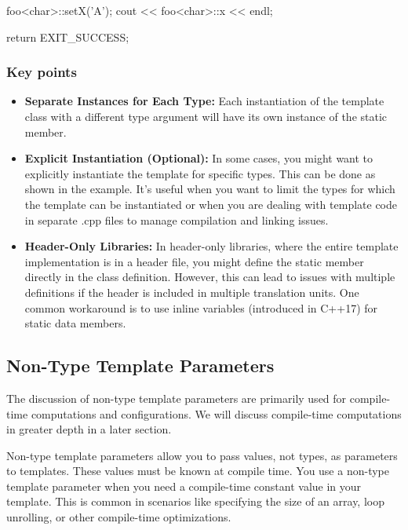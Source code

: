\documentclass{report}
\begin{document}
\begin{concept}
\begin{cppcode}
{        foo<char>::setX('A');
        cout << foo<char>::x << endl;

        return EXIT_SUCCESS;
    }
    \end{cppcode}

    \pagebreak 
    \subsubsection{Key points}
    \begin{itemize}
        \item \textbf{Separate Instances for Each Type:} Each instantiation of the template class with a different type argument will have its own instance of the static member. 
        \item \textbf{Explicit Instantiation (Optional):} In some cases, you might want to explicitly instantiate the template for specific types. This can be done as shown in the example. It's useful when you want to limit the types for which the template can be instantiated or when you are dealing with template code in separate .cpp files to manage compilation and linking issues.
        \item \textbf{Header-Only Libraries:} In header-only libraries, where the entire template implementation is in a header file, you might define the static member directly in the class definition. However, this can lead to issues with multiple definitions if the header is included in multiple translation units. One common workaround is to use inline variables (introduced in C++17) for static data members.
    \end{itemize}

    \bigbreak \noindent 
    \subsection{Non-Type Template Parameters}
    \bigbreak \noindent 
    \begin{remark}
        The discussion of non-type template parameters are primarily used for compile-time computations and configurations. We will discuss compile-time computations in greater depth in a later section.
    \end{remark}

    \bigbreak \noindent 
    \begin{concept}
        Non-type template parameters allow you to pass values, not types, as parameters to templates. These values must be known at compile time.
        \bigbreak \noindent 
        You use a non-type template parameter when you need a compile-time constant value in your template. This is common in scenarios like specifying the size of an array, loop unrolling, or other compile-time optimizations.
    \end{concept}


\end{concept}
\end{document}
